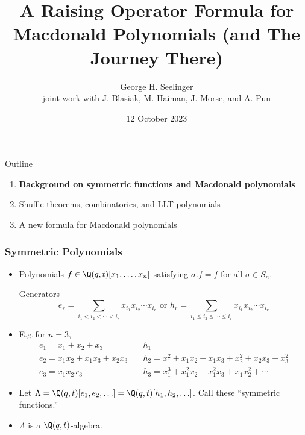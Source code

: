 \documentclass[dvipsnames,handout]{beamer}
\title[Macdonald Catalanimals]{A Raising Operator Formula for
  Macdonald Polynomials (and The Journey There)} %
\author[George H. Seelinger]{George H. Seelinger \\ joint work with
  J. Blasiak, M. Haiman, J. Morse, and A. Pun} %
\institute[UMich] %
{
ghseeli@umich.edu\\ %
\medskip
Universit\'{a} di Pisa Seminar on Combinatorics, Lie Theory, and Topology\\ %
\medskip
}
\date{12 October 2023} %
\newcommand{\sym}{\Lambda}
\theoremstyle{definition}
\newcounter{c}
\begin{document}
\begin{frame}
\titlepage %
\end{frame}
\begin{frame}{Outline}
  \begin{enumerate}
  \item {\bf Background on symmetric functions and Macdonald polynomials}
  \item Shuffle theorems, combinatorics, and LLT polynomials
  \item A new formula for Macdonald polynomials
  \end{enumerate}
\end{frame}
\begin{frame}
  \frametitle{Symmetric Polynomials}
  \begin{itemize}
  \item Polynomials \(f \in \Q(q,t)[x_1,\ldots,x_n]\) satisfying \(\sigma.f
    = f\) for all \(\sigma \in S_n\).\pause
    \begin{block}{Generators}
    \[
      e_r =
      \sum_{i_1 < i_2 < \cdots < i_r} x_{i_1} x_{i_2} \cdots x_{i_r}
      \text { or }
      h_r = 
      \sum_{i_1 \leq i_2 \leq \cdots \leq i_r} x_{i_1} x_{i_2} \cdots x_{i_r}
    \]\pause 
  \end{block}
    \item E.g.\,for \(n=3\),
    \begin{align*}
      e_1 = x_1 + x_2 + x_3 = & h_1  \\
      e_2 = x_1 x_2 + x_1 x_3 + x_2 x_3 \quad & h_2 = x_1^2 + x_1 x_2 + x_1
                                          x_3 + x_2^2 +  x_2 x_3 +x_3^2  \\
      e_3 = x_1 x_2 x_3 \quad & h_3 = x_1^3 + x_1^2 x_2 + x_1^2 x_3 + x_1
                          x_2^2 + \cdots
    \end{align*} \pause
    \item Let \(\sym =
      \Q(q,t)[e_1,e_2,\ldots] = \Q(q,t)[h_1,h_2,\ldots]\). Call these
      ``symmetric functions.''\pause
    \item \(\sym\) is a \(\Q(q,t)\)-algebra.
  \end{itemize}
\end{frame}
\end{document}
